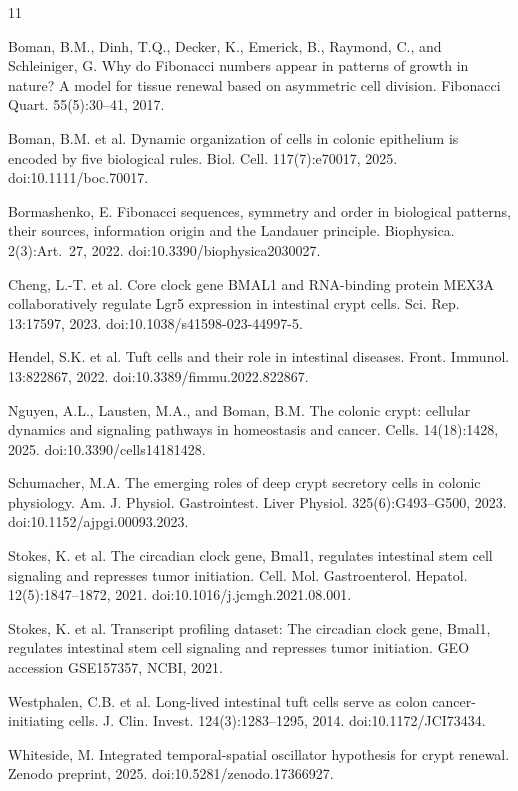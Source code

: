 \documentclass[]{interact}
\begin{document}
\begin{thebibliography}{11}

Boman, B.M., Dinh, T.Q., Decker, K., Emerick, B., Raymond, C., and
Schleiniger, G.
Why do Fibonacci numbers appear in patterns of growth in nature? A model for
tissue renewal based on asymmetric cell division.
Fibonacci Quart. 55(5):30--41, 2017.

Boman, B.M. et al.
Dynamic organization of cells in colonic epithelium is encoded by five
biological rules.
Biol. Cell. 117(7):e70017, 2025.
doi:10.1111/boc.70017.

Bormashenko, E.
Fibonacci sequences, symmetry and order in biological patterns, their sources,
information origin and the Landauer principle.
Biophysica. 2(3):Art.\ 27, 2022.
doi:10.3390/biophysica2030027.

Cheng, L.-T. et al.
Core clock gene BMAL1 and RNA-binding protein MEX3A collaboratively regulate
Lgr5 expression in intestinal crypt cells.
Sci. Rep. 13:17597, 2023.
doi:10.1038/s41598-023-44997-5.

Hendel, S.K. et al.
Tuft cells and their role in intestinal diseases.
Front. Immunol. 13:822867, 2022.
doi:10.3389/fimmu.2022.822867.

Nguyen, A.L., Lausten, M.A., and Boman, B.M.
The colonic crypt: cellular dynamics and signaling pathways in homeostasis and
cancer.
Cells. 14(18):1428, 2025.
doi:10.3390/cells14181428.

Schumacher, M.A.
The emerging roles of deep crypt secretory cells in colonic physiology.
Am. J. Physiol. Gastrointest. Liver Physiol. 325(6):G493--G500, 2023.
doi:10.1152/ajpgi.00093.2023.

Stokes, K. et al.
The circadian clock gene, Bmal1, regulates intestinal stem cell signaling and
represses tumor initiation.
Cell. Mol. Gastroenterol. Hepatol. 12(5):1847--1872, 2021.
doi:10.1016/j.jcmgh.2021.08.001.

Stokes, K. et al.
Transcript profiling dataset: The circadian clock gene, Bmal1, regulates
intestinal stem cell signaling and represses tumor initiation.
GEO accession GSE157357, NCBI, 2021.

Westphalen, C.B. et al.
Long-lived intestinal tuft cells serve as colon cancer-initiating cells.
J. Clin. Invest. 124(3):1283--1295, 2014.
doi:10.1172/JCI73434.

Whiteside, M.
Integrated temporal-spatial oscillator hypothesis for crypt renewal.
Zenodo preprint, 2025.
doi:10.5281/zenodo.17366927.

\end{thebibliography}
\end{document}
